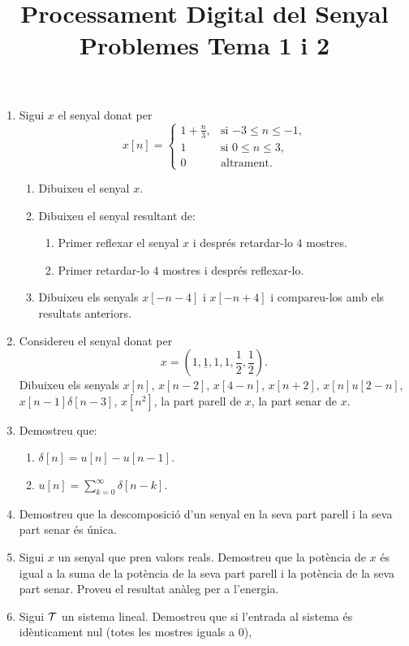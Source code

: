 \documentclass[a4paper,12pt]{article}
\title{Processament Digital del Senyal \\ Problemes Tema 1 i 2}
\date{}
\newcommand\cT{{\cal T}}
\begin{document}
\maketitle{}

\begin{enumerate}
\item Sigui $x$ el senyal donat per
  $$x[n]=\begin{cases}
    1+\frac n3,& \text{si $-3\le n\le -1$,}\\
    1 & \text{si $0\le n\le 3$,}\\
    0 & \text{altrament}.
  \end{cases}
  $$
  \begin{enumerate}
  \item Dibuixeu el senyal $x$.
  \item Dibuixeu el senyal resultant de:
    \begin{enumerate}
    \item Primer reflexar el senyal $x$ i després retardar-lo $4$
      mostres.
    \item Primer retardar-lo $4$ mostres i després reflexar-lo.
    \end{enumerate}
  \item Dibuixeu els senyals $x[-n-4]$ i $x[-n+4]$ i compareu-los amb
  els resultats anteriors.
  \end{enumerate}
\item Considereu el senyal donat per
  $$x=(1,\underline{1},1,1,\frac12,\frac12).$$
  Dibuixeu els senyals $x[n]$, $x[n-2]$, $x[4-n]$, $x[n+2]$,
  $x[n]u[2-n]$, $x[n-1]\delta[n-3]$, $x[n^2]$, la part parell de $x$,
  la part senar de $x$.
\item Demostreu que:
  \begin{enumerate}
  \item $\delta[n]=u[n]-u[n-1]$.
  \item $u[n]=\sum_{k=0}^\infty
    \delta[n-k]$. 
  \end{enumerate}
\item Demostreu que la descomposició d'un senyal en la seva part
  parell i la seva part senar és única.
\item Sigui $x$ un senyal que pren valors reals. Demostreu que la
  potència de $x$ és igual a la suma de la potència de la seva part
  parell i la potència de la seva part senar. Proveu el resultat
  anàleg per a l'energia.
\item Sigui $\cT$ un sistema lineal. Demostreu que si l'entrada al
  sistema és idènticament nul (totes les mostres iguals a $0$),

\end{enumerate}
\end{document}
